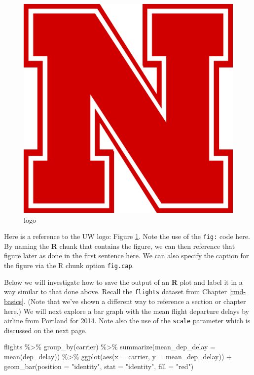 \documentclass[print]{nuthesis}
\newenvironment{Shaded}{\begin{snugshade}}{\end{snugshade}}
\newcommand{\AttributeTok}[1]{\textcolor[rgb]{0.77,0.63,0.00}{#1}}
\newcommand{\FunctionTok}[1]{\textcolor[rgb]{0.00,0.00,0.00}{#1}}
\newcommand{\NormalTok}[1]{#1}
\newcommand{\SpecialCharTok}[1]{\textcolor[rgb]{0.00,0.00,0.00}{#1}}
\newcommand{\StringTok}[1]{\textcolor[rgb]{0.31,0.60,0.02}{#1}}
\begin{document}
\begin{figure}
\includegraphics[width=\linewidth]{figure/unl} \caption{logo}\label{fig:uwlogo}
\end{figure}

Here is a reference to the UW logo: Figure \ref{fig:uwlogo}. Note the use of the \texttt{fig:} code here. By naming the \textbf{R} chunk that contains the figure, we can then reference that figure later as done in the first sentence here. We can also specify the caption for the figure via the R chunk option \texttt{fig.cap}.

\clearpage

Below we will investigate how to save the output of an \textbf{R} plot and label it in a way similar to that done above. Recall the \texttt{flights} dataset from Chapter \ref{rmd-basics}. (Note that we've shown a different way to reference a section or chapter here.) We will next explore a bar graph with the mean flight departure delays by airline from Portland for 2014. Note also the use of the \texttt{scale} parameter which is discussed on the next page.

\begin{Shaded}
\begin{Highlighting}[]
\NormalTok{flights }\SpecialCharTok{\%\textgreater{}\%}
    \FunctionTok{group\_by}\NormalTok{(carrier) }\SpecialCharTok{\%\textgreater{}\%}
    \FunctionTok{summarize}\NormalTok{(}\AttributeTok{mean\_dep\_delay =} \FunctionTok{mean}\NormalTok{(dep\_delay)) }\SpecialCharTok{\%\textgreater{}\%}
    \FunctionTok{ggplot}\NormalTok{(}\FunctionTok{aes}\NormalTok{(}\AttributeTok{x =}\NormalTok{ carrier, }\AttributeTok{y =}\NormalTok{ mean\_dep\_delay)) }\SpecialCharTok{+}
    \FunctionTok{geom\_bar}\NormalTok{(}\AttributeTok{position =} \StringTok{"identity"}\NormalTok{, }\AttributeTok{stat =} \StringTok{"identity"}\NormalTok{,}
        \AttributeTok{fill =} \StringTok{"red"}\NormalTok{)}
\end{Highlighting}
\end{Shaded}
\end{document}
